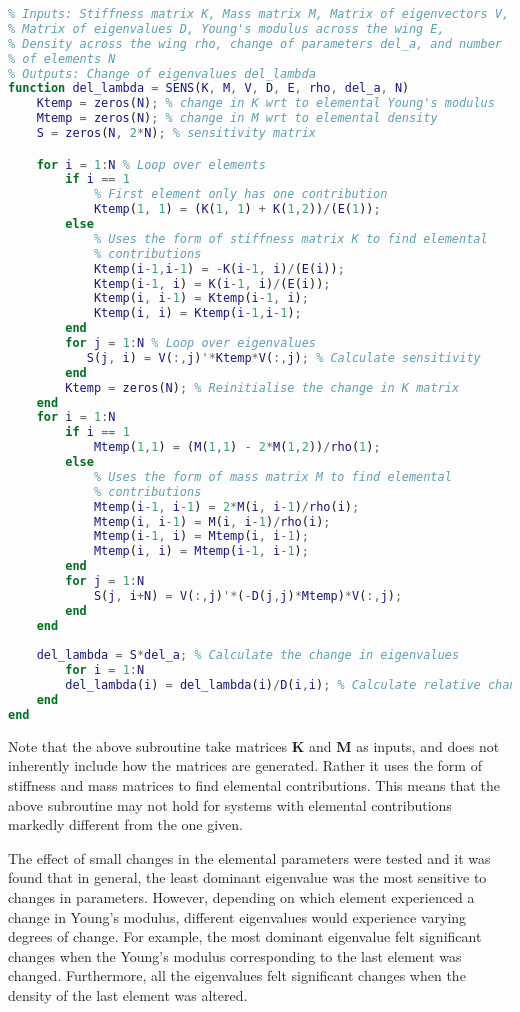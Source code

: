 \documentclass[11pt,oneside]{article}
\begin{document}
\begin{lstlisting}[language=Matlab]
%% Sensitivity to changes in parameters at each element
% Inputs: Stiffness matrix K, Mass matrix M, Matrix of eigenvectors V,
% Matrix of eigenvalues D, Young's modulus across the wing E,
% Density across the wing rho, change of parameters del_a, and number 
% of elements N
% Outputs: Change of eigenvalues del_lambda
function del_lambda = SENS(K, M, V, D, E, rho, del_a, N)
    Ktemp = zeros(N); % change in K wrt to elemental Young's modulus
    Mtemp = zeros(N); % change in M wrt to elemental density
    S = zeros(N, 2*N); % sensitivity matrix

    for i = 1:N % Loop over elements
        if i == 1 
            % First element only has one contribution
            Ktemp(1, 1) = (K(1, 1) + K(1,2))/(E(1));
        else
            % Uses the form of stiffness matrix K to find elemental
            % contributions
            Ktemp(i-1,i-1) = -K(i-1, i)/(E(i));
            Ktemp(i-1, i) = K(i-1, i)/(E(i));
            Ktemp(i, i-1) = Ktemp(i-1, i); 
            Ktemp(i, i) = Ktemp(i-1,i-1);
        end
        for j = 1:N % Loop over eigenvalues
           S(j, i) = V(:,j)'*Ktemp*V(:,j); % Calculate sensitivity
        end
        Ktemp = zeros(N); % Reinitialise the change in K matrix
    end
    for i = 1:N
        if i == 1
            Mtemp(1,1) = (M(1,1) - 2*M(1,2))/rho(1);
        else
            % Uses the form of mass matrix M to find elemental
            % contributions
            Mtemp(i-1, i-1) = 2*M(i, i-1)/rho(i);
            Mtemp(i, i-1) = M(i, i-1)/rho(i);
            Mtemp(i-1, i) = Mtemp(i, i-1);
            Mtemp(i, i) = Mtemp(i-1, i-1);
        end
        for j = 1:N
            S(j, i+N) = V(:,j)'*(-D(j,j)*Mtemp)*V(:,j);
        end
    end
    
    del_lambda = S*del_a; % Calculate the change in eigenvalues
        for i = 1:N
        del_lambda(i) = del_lambda(i)/D(i,i); % Calculate relative change
    end
end
\end{lstlisting}

Note that the above subroutine take matrices \textbf{K} and \textbf{M} as inputs, and does not inherently include how the matrices are generated. Rather it uses the form of stiffness and mass matrices to find elemental contributions. This means that the above subroutine may not hold for systems with elemental contributions markedly different from the one given.

The effect of small changes in the elemental parameters were tested and it was found that in general, the least dominant eigenvalue was the most sensitive to changes in parameters. However, depending on which element experienced a change in Young's modulus, different eigenvalues would experience varying degrees of change. For example, the most dominant eigenvalue felt significant changes when the Young's modulus corresponding to the last element was changed. Furthermore, all the eigenvalues felt significant changes when the density of the last element was altered.
\end{document}
